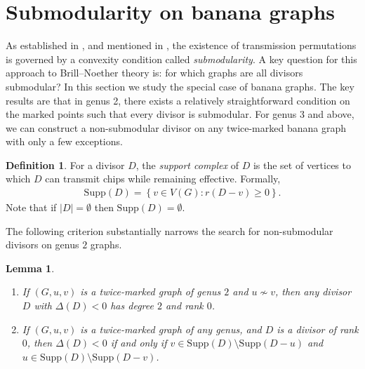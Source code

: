 \documentclass[11pt]{article}
\newtheorem{lemma}[theo]{Lemma}
\theoremstyle{definition}
\newtheorem{defi}[theo]{Definition}
\numberwithin{equation}{section}
\newcommand{\Supp}{\mathrm{Supp}}
\newcommand{\set}[1]{\left\{{#1}\right\}}
\begin{document}
\section{Submodularity on banana graphs}
\label{sec:submodularity}

As established in \cite{Pfl22}, and mentioned in , the existence of transmission permutations is governed by a convexity condition called \textit{submodularity}. A key question for this approach to Brill--Noether theory is: for which graphs are all divisors submodular? In this section we study the special case of banana graphs. The key results are that in genus 2, there exists a relatively straightforward condition on the marked points such that every divisor is submodular. For genus $3$ and above, we can construct a non-submodular divisor on any twice-marked banana graph with only a few exceptions.

\begin{defi}\label{def-Supp}
For a divisor $D$, the \textit{support complex} of $D$ is the set of vertices to which $D$ can transmit chips while remaining effective. Formally,
\begin{align*}
    \Supp(D) = \set{v \in V(G):r(D-v)\geq 0}.
\end{align*}
Note that if $|D| = \emptyset$ then $\Supp(D) = \emptyset$.
\end{defi}

The following criterion substantially narrows the search for non-submodular divisors on genus $2$ graphs.

\begin{lemma}\label{lemm-rank0supp}
\begin{enumerate}[label = \arabic*)]
\item
    If $(G,u,v)$ is a twice-marked graph of genus $2$ and $u \not\sim v$, then any divisor $D$ with $\Delta(D)<0$ has degree $2$ and rank $0$. 
\item 
If $(G,u,v)$ is a twice-marked graph of \emph{any genus}, and $D$ is a divisor of rank $0$, then $\Delta(D)<0$ if and only if $v \in \Supp(D)\setminus \Supp(D-u)$ and $u \in \Supp(D) \setminus \Supp(D-v)$.
\end{enumerate}
\end{lemma}
\end{document}
